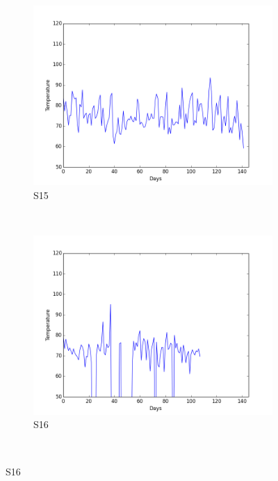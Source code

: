 \documentclass[12pt]{article} %
\begin{document}
\begin{figure}[H]
    \begin{subfigure}[b]{0.30\textwidth}
        \includegraphics[width=\textwidth]{img/graphs/15-heartrate-1}
        \caption{S15}
        \label{fig:s15HT}
    \end{subfigure}
    ~ %
    \begin{subfigure}[b]{0.30\textwidth}
        \includegraphics[width=\textwidth]{img/graphs/16-heartrate-1}
        \caption{S16}
        \label{fig:s16HT}
    \end{subfigure}
    ~ %

\end{figure}
\end{document}
